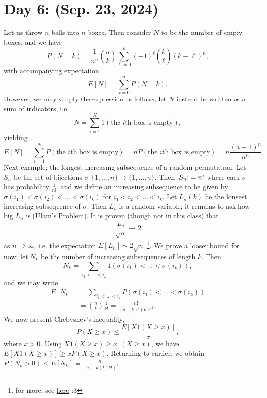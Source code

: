 \section{Day 6: (Sep. 23, 2024)}
Let us throw $n$ balls into $n$ boxes. Then consider $N$ to be the number of empty boxes, and we have
\[ P(N = k) = \frac{1}{n^n} \binom{n}{k} \sum_{\ell = 0}^k (-1)^\ell \binom{k}{\ell} (k - \ell)^n, \]
with accompanying expectation
\[ E[N] = \sum_{k = 0}^n P(N = k). \]
However, we may simply the expression as follows; let $N$ instead be written as a sum of indicators, i.e.
\[ N = \sum_{i=1}^N 1(\text{the } i\text{th box is empty}), \]
yielding
\[ E[N] = \sum_{i=1}^N P(\text{the } i\text{th box is empty}) = nP(\text{the } i\text{th box is empty}) = n \frac{(n-1)^n}{n^n}. \]
Next example; the longest increasing subsequence of a random permutation. Let $S_n$ be the set of bijections $\sigma : \{1, \dots, n\} \to \{1, \dots, n\}$. Then $\left\lvert S_n \right\rvert = n!$ where each $\sigma$ has probability $\frac{1}{n!}$, and we define an increasing subsequence to be given by $\sigma(i_1) < \sigma(i_2) < \dots < \sigma(i_k)$ for $i_1 < i_2 < \dots < i_k$. Let $L_n(k)$ be the longest increasing subsequence of $\sigma$. Then $L_n$ is a random variable; it remains to ask how big $L_n$ is (Ulam's Problem). It is proven (though not in this class) that
\[ \frac{L_n}{\sqrt{n}} \to 2 \]
as $n \to \infty$, i.e. the expectation $E[L_n] \sim 2\sqrt{n}$ \footnote{for more, see \href{https://www.ams.org/journals/jams/1999-12-04/S0894-0347-99-00307-0/S0894-0347-99-00307-0.pdf}{here} :3}.
\medskip\newline
\noindent We prove a looser bound for now; let $N_k$ be the number of increasing subsequences of length $k$. Then
\[ N_k = \sum_{i_1 < \dots < i_k} 1(\sigma(i_1) < \dots < \sigma(i_k)), \]
and we may write
\begin{align*}
    E[N_k] &= \sum_{i_1 < \dots < i_k} P(\sigma(i_1) < \dots < \sigma(i_k)) \\
    &= \binom{n}{k} \frac{1}{k!} = \frac{n!}{(n-k)! (k)!^2}.
\end{align*}
We now present Chebyshev's inequality,
\[ P(X \geq x) \leq \frac{E[X 1(X \geq x)]}{x}, \]
where $x > 0$. Using $X 1(X \geq x) \geq x 1(X \geq x)$, we have $E[X 1(X \geq x)] \geq x P(X \geq x)$. Returning to earlier, we obtain $P(N_k > 0) \leq E[N_k] = \frac{n!}{(n-k)!(k!)^2}$.

